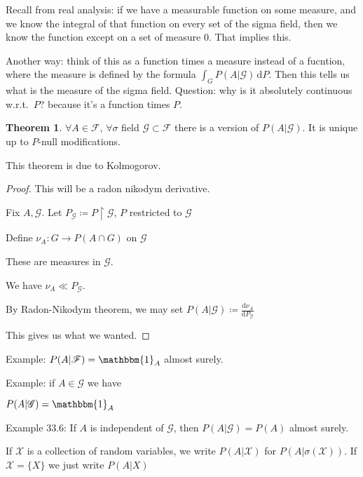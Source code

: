\documentclass{article}
\theoremstyle{definition}
\newtheorem{theorem}{Theorem}
\begin{document}
Recall from real analysis: if we have a measurable function on some measure, and we know the integral of that function on every set of the sigma field, then we know the function except on a set of measure 0. That implies this.

Another way: think of this as a function times a measure instead of a fucntion, where the measure is defined by the formula \(\int_{G}^{} P(A|\mathcal{G}) \,\mathrm{d}P \). Then this tells us what is the measure of the sigma field. Question: why is it absolutely continuous w.r.t.\ \(P\)? because it's a function times \(P\).

\begin{theorem}
    \(\forall A \in \mathscr{F}\), \(\forall \sigma\) field \(\mathscr{G} \subset \mathscr{F} \) there is a version of \(P(A|\mathscr{G})\). It is unique up to \(P\)-null modifications.
\end{theorem}

This theorem is due to Kolmogorov.

\begin{proof}
    This will be a radon nikodym derivative.

    Fix \(A,\mathscr{G}\). Let \(P_{\mathscr{G}}\coloneqq P \upharpoonright \mathscr{G} \), \(P\) restricted to \(\mathscr{G}\) 
    
    Define \(\nu_A : G \to P(A\cap G)\) on \(\mathscr{G}\)

    These are measures in \(\mathscr{G}\).

    We have \(\nu_A \ll P_{\mathscr{G}} \).
    
    By Radon-Nikodym theorem, we may set \(P(A|\mathscr{G})\coloneqq \frac{\mathrm{d}\nu_A}{\mathrm{d}P_{\mathscr{G}} }\)
    
    This gives us what we wanted.

\end{proof}

Example: \(P(A | \mathscr{F}) = \mathbbm{1}_{A} \) almost surely.

Example: if \(A\in \mathscr{G}\) we have

\(P(A|\mathscr{G})=\mathbbm{1}_{A} \) 

Example 33.6: If \(A\) is independent of \(\mathscr{G}\), then \(P(A|\mathscr{G})=P(A)\) almost surely.

If \(\mathscr{X}\) is a collection of random variables, we write \(P(A|\mathscr{X})\) for \(P(A|\sigma(\mathscr{X}))\). If \(\mathscr{X} = \{ X \} \) we just write \(P(A|X)\) 
\end{document}
